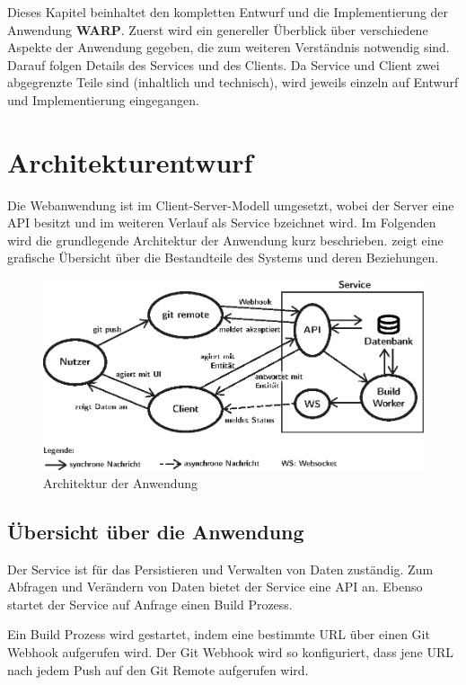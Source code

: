 Dieses Kapitel beinhaltet den kompletten Entwurf und die Implementierung der Anwendung \textbf{WARP}. Zuerst wird ein genereller Überblick über verschiedene Aspekte der Anwendung gegeben, die zum weiteren Verständnis notwendig sind. Darauf folgen Details des Services und des Clients. Da Service und Client zwei abgegrenzte Teile sind (inhaltlich und technisch), wird jeweils einzeln auf Entwurf und Implementierung eingegangen.

\section{Architekturentwurf}
\label{sec:architektur}

Die Webanwendung ist im Client-Server-Modell umgesetzt, wobei der Server eine API besitzt und im weiteren Verlauf als Service bzeichnet wird. Im Folgenden wird die grundlegende Architektur der Anwendung kurz beschrieben.  zeigt eine grafische Übersicht über die Bestandteile des Systems und deren Beziehungen.

\begin{figure}[h]
  \caption{Architektur der Anwendung}
  \label{fig:architektur}
  \centering
    \includegraphics[width=\textwidth]{assets/systemarchitektur}
\end{figure}

\subsection{Übersicht über die Anwendung}
\label{subsec:uebersicht-anwendung}

Der Service ist für das Persistieren und Verwalten von Daten zuständig. Zum Abfragen und Verändern von Daten bietet der Service eine \ac{API} an. Ebenso startet der Service auf Anfrage einen Build Prozess.

Ein Build Prozess wird gestartet, indem eine bestimmte URL über einen Git Webhook aufgerufen wird. Der Git Webhook wird so konfiguriert, dass jene URL nach jedem Push auf den Git Remote aufgerufen wird.

